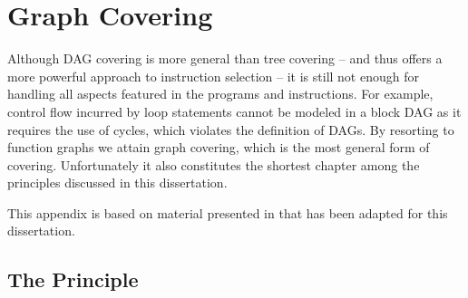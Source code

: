 %

\chapter{Graph Covering}


Although \gls{DAG covering} is more general than \gls{tree covering} -- and thus
offers a more powerful approach to \gls{instruction selection} -- it is still
not enough for handling all aspects featured in the \glspl{program} and
\glspl{instruction}.
%
For example, control flow incurred by loop statements cannot be modeled in a
\gls{block DAG} as it requires the use of \glspl{cycle}, which violates the
definition of \glspl{DAG}.
%
By resorting to \glspl{function graph} we attain \gls{graph covering}, which is
the most general form of covering.
%
Unfortunately it also constitutes the shortest chapter among the
\glspl{principle} discussed in this dissertation.

This appendix is based on material presented in
\cite[Chap.]{HjortBlindell:2016:Survey} that has been adapted for
this dissertation.


\section{The Principle}


